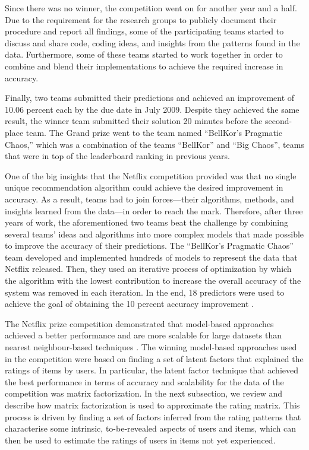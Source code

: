 Since there was no winner, the competition went on for another year and a half. Due to the requirement for the research groups to publicly document their procedure and report all findings, some of the participating teams started to discuss and share code, coding ideas, and insights from the patterns found in the data. Furthermore, some of these teams started to work together in order to combine and blend their implementations to achieve the required increase in accuracy.

Finally, two teams submitted their predictions and achieved an improvement of 10.06 percent each by the due date in July 2009. Despite they achieved the same result, the winner team submitted their solution 20 minutes before the second-place team. The Grand prize went to the team named ``BellKor's Pragmatic Chaos,'' which was a combination of the teams ``BellKor'' and ``Big Chaos''\autocite{koren09bellkor}, teams that were in top of the leaderboard ranking in previous years.

One of the big insights that the Netflix competition provided was that no single unique recommendation algorithm could achieve the desired improvement in accuracy. As a result, teams had to join forces---their algorithms, methods, and insights learned from the data---in order to reach the mark. Therefore, after three years of work, the aforementioned two teams beat the challenge by combining several teams' ideas and algorithms into more complex models that made possible to improve the accuracy of their predictions.
The ``BellKor's Pragmatic Chaos'' team developed and implemented hundreds of models to represent the data that Netflix released. Then, they used an iterative process of optimization by which the algorithm with the lowest contribution to increase the overall accuracy of the system was removed in each iteration. In the end, 18 predictors were used to achieve the goal of obtaining the 10 percent accuracy improvement \autocite{toscher09bigchaos}. 

The Netflix prize competition demonstrated that model-based approaches achieved a better performance and are more scalable for large datasets than nearest neighbour-based techniques \autocite{koren09matrix}. The winning model-based approaches used in the competition were based on finding a set of latent factors that explained the ratings of items by users. In particular, the latent factor technique that achieved the best performance in terms of accuracy and scalability for the data of the competition was matrix factorization. 
In the next subsection, we review and describe how matrix factorization is used to approximate the rating matrix. This process is driven by finding a set of factors inferred from the rating patterns that characterise some intrinsic, to-be-revealed aspects of users and items, which can then be used to estimate the ratings of users in items not yet experienced.

